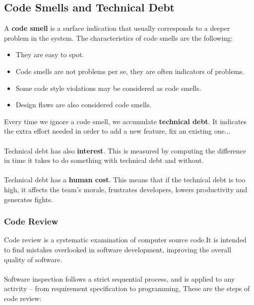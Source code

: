 \documentclass{article}
\begin{document}
\subsection{Code Smells and Technical Debt}
A \textbf{code smell} is a surface indication that usually corresponds to a deeper problem in the system. The characteristics of code smells are the following:

\begin{itemize}
	\item They are easy to spot.
	
	\item Code smells are not problems per se, they are often indicators of problems.
	
	\item Some code style violations may be considered as code smells.
	
	\item Design flaws are also considered code smells.
\end{itemize}
Every time we ignore a code smell, we accumulate \textbf{technical debt}. It indicates the extra effort needed in order to add a new feature, fix an existing one... \\ \\
Technical debt has also \textbf{interest}. This is measured by computing the difference in time it takes to do something with technical debt and without. \\ \\
Technical debt has a \textbf{human cost}. This means that if the technical debt is too high, it affects the team's morale, frustrates developers, lowers productivity and generates fights.

\subsubsection{Code Review}
Code review is a systematic examination of computer source code.It is intended to find mistakes overlooked in software development, improving the overall quality of software. \\ \\
Software inspection follows a strict sequential process, and is applied to any activity -- from requirement specification to programming, These are the steps of code review:
\end{document}
